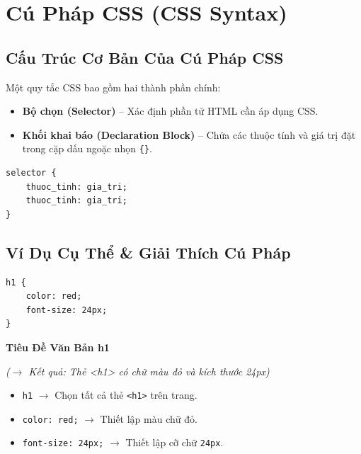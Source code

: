 \documentclass[11pt,oneside]{book}
\newcommand{\codeinline}[1]{\textcolor{accentOrange}{\texttt{#1}}}
\begin{document}
\section{Cú Pháp CSS (CSS Syntax)}

\subsection{Cấu Trúc Cơ Bản Của Cú Pháp CSS}
Một quy tắc CSS bao gồm hai thành phần chính:
\begin{itemize}[leftmargin=1.5em, itemsep=2pt, parsep=0pt]
    \item \textbf{Bộ chọn (Selector)} -- Xác định phần tử HTML cần áp dụng CSS.
    \item \textbf{Khối khai báo (Declaration Block)} -- Chứa các thuộc tính và giá trị đặt trong cặp dấu ngoặc nhọn \codeinline{\{\}}.
\end{itemize}

\begin{codeWindow}
\begin{lstlisting}[language=CSS3]
selector {
    thuoc_tinh: gia_tri;
    thuoc_tinh: gia_tri;
}
\end{lstlisting}
\end{codeWindow}

\subsection{Ví Dụ Cụ Thể \& Giải Thích Cú Pháp}
\begin{codeWindow}
\begin{lstlisting}[language=CSS3]
h1 {
    color: red;
    font-size: 24px;
}
\end{lstlisting}
\end{codeWindow}

\begin{browserWindow}
\sffamily\small
{\color{red}\bfseries\Large Tiêu Đề Văn Bản h1} \par\vspace{4pt}
\textcolor{gray!70}{\small\textit{($\rightarrow$ Kết quả: Thẻ <h1> có chữ màu đỏ và kích thước 24px)}}
\end{browserWindow}

\begin{noteBox}
\begin{itemize}[leftmargin=1.5em, itemsep=2pt, parsep=0pt]
    \item \codeinline{h1} $\rightarrow$ Chọn tất cả thẻ \codeinline{<h1>} trên trang.
    \item \codeinline{color: red;} $\rightarrow$ Thiết lập màu chữ đỏ.
    \item \codeinline{font-size: 24px;} $\rightarrow$ Thiết lập cỡ chữ \codeinline{24px}.
\end{itemize}
\end{noteBox}
\end{document}
